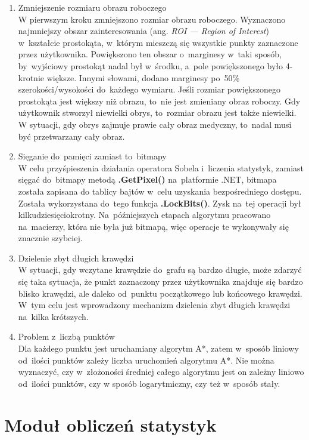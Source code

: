 \documentclass[a4paper,11pt,twoside,openright]{report}
\theoremstyle{definition}
\begin{document}
\begin{enumerate}
\item Zmniejszenie rozmiaru obrazu roboczego \\
W pierwszym kroku zmniejszono rozmiar obrazu roboczego. Wyznaczono najmniejszy obszar
zainteresowania (ang. \textit{ROI --- Region of Interest}) w~kształcie
prostokąta, w~którym mieszczą się wszystkie punkty zaznaczone przez użytkownika.
Powiększono ten obszar o~marginesy w~taki sposób, by~wyjściowy prostokąt nadal
był w~środku, a~pole powiększonego było 4-krotnie większe. Innymi słowami,
dodano marginesy po~50\% szerokości/wysokości do~każdego wymiaru. Jeśli rozmiar
powiększonego prostokąta jest większy niż obrazu, to~nie jest zmieniany obraz roboczy.
Gdy użytkownik stworzył niewielki obrys, to~rozmiar obrazu jest także niewielki.
W sytuacji, gdy obrys zajmuje prawie cały obraz medyczny, to~nadal musi być
przetwarzany cały obraz.
\item Sięganie do~pamięci zamiast to~bitmapy \\
W celu przyśpieszenia działania operatora Sobela i~liczenia statystyk, zamiast
sięgać do~bitmapy metodą \textbf{.GetPixel()} na~platformie .NET, bitmapa została zapisana
do tablicy bajtów w~celu uzyskania bezpośredniego dostępu. Została wykorzystana do~tego
funkcja \textbf{.LockBits()}. Zysk na~tej operacji był kilkudziesięciokrotny. Na~późniejszych
etapach algorytmu pracowano na~macierzy, która nie była już bitmapą, więc operacje
te wykonywały się znacznie szybciej.
\item Dzielenie zbyt długich krawędzi \\
W sytuacji, gdy wczytane krawędzie do~grafu są bardzo długie, może zdarzyć się
taka sytuacja, że punkt zaznaczony przez użytkownika znajduje się bardzo blisko
krawędzi, ale daleko od~punktu początkowego lub końcowego krawędzi. W~tym celu
jest wprowadzony mechanizm dzielenia zbyt długich krawędzi na~kilka krótszych.
\item Problem z~liczbą punktów \\
Dla każdego punktu jest uruchamiany algorytm A*, zatem w~sposób liniowy od~ilości
punktów zależy liczba uruchomień algorytmu A*. Nie można wyznaczyć, czy w~złożoności
średniej całego algorytmu jest on zależny liniowo od~ilości punktów, czy
w sposób logarytmiczny, czy też w~sposób stały.
\end{enumerate}

\section {Moduł obliczeń statystyk}
\end{document}
